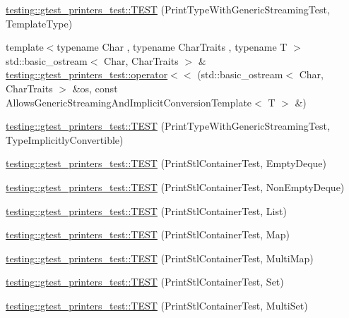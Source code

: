 \begin{DoxyCompactItemize}
\item 
\hyperlink{namespacetesting_1_1gtest__printers__test_a6e180c85f307712a995985f7bc735fd1}{testing\+::gtest\+\_\+printers\+\_\+test\+::\+T\+E\+S\+T} (Print\+Type\+With\+Generic\+Streaming\+Test, Template\+Type)
\item 
{\footnotesize template$<$typename Char , typename Char\+Traits , typename T $>$ }\\std\+::basic\+\_\+ostream$<$ Char, Char\+Traits $>$ \& \hyperlink{namespacetesting_1_1gtest__printers__test_a09eedfbca613302efe6438d2a537f419}{testing\+::gtest\+\_\+printers\+\_\+test\+::operator$<$$<$} (std\+::basic\+\_\+ostream$<$ Char, Char\+Traits $>$ \&os, const Allows\+Generic\+Streaming\+And\+Implicit\+Conversion\+Template$<$ T $>$ \&)
\item 
\hyperlink{namespacetesting_1_1gtest__printers__test_a68877c5e1ec7a53281798310c30e1776}{testing\+::gtest\+\_\+printers\+\_\+test\+::\+T\+E\+S\+T} (Print\+Type\+With\+Generic\+Streaming\+Test, Type\+Implicitly\+Convertible)
\item 
\hyperlink{namespacetesting_1_1gtest__printers__test_a1ce10b8a3634e0f6bfbfbb5888c04a95}{testing\+::gtest\+\_\+printers\+\_\+test\+::\+T\+E\+S\+T} (Print\+Stl\+Container\+Test, Empty\+Deque)
\item 
\hyperlink{namespacetesting_1_1gtest__printers__test_a249d482cf4a1525bd043489dcbd3e200}{testing\+::gtest\+\_\+printers\+\_\+test\+::\+T\+E\+S\+T} (Print\+Stl\+Container\+Test, Non\+Empty\+Deque)
\item 
\hyperlink{namespacetesting_1_1gtest__printers__test_aaa135672ff79ecaef82c6046f2ab8d29}{testing\+::gtest\+\_\+printers\+\_\+test\+::\+T\+E\+S\+T} (Print\+Stl\+Container\+Test, List)
\item 
\hyperlink{namespacetesting_1_1gtest__printers__test_a3d701a1866f260a42411e9041894c49c}{testing\+::gtest\+\_\+printers\+\_\+test\+::\+T\+E\+S\+T} (Print\+Stl\+Container\+Test, Map)
\item 
\hyperlink{namespacetesting_1_1gtest__printers__test_a8a498c956a5b1c0358d126e1ad56fac0}{testing\+::gtest\+\_\+printers\+\_\+test\+::\+T\+E\+S\+T} (Print\+Stl\+Container\+Test, Multi\+Map)
\item 
\hyperlink{namespacetesting_1_1gtest__printers__test_abdc498462741033074f8e86b7c0bd480}{testing\+::gtest\+\_\+printers\+\_\+test\+::\+T\+E\+S\+T} (Print\+Stl\+Container\+Test, Set)
\item 
\hyperlink{namespacetesting_1_1gtest__printers__test_adaa3e1cfa3feca377b3958edb41fc0f1}{testing\+::gtest\+\_\+printers\+\_\+test\+::\+T\+E\+S\+T} (Print\+Stl\+Container\+Test, Multi\+Set)

\end{DoxyCompactItemize}
